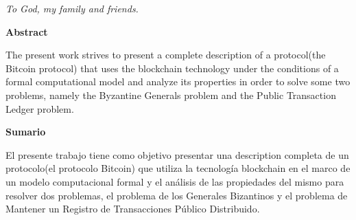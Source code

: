 \documentclass[../Main.tex]{subfiles}
\begin{document}
\begin{flushright}
	\null
	\vspace{15em}
	\emph{To God, my family and friends.}
\end{flushright}



\clearpage
\null
\vfill
\begin{center}
	\textbf{Abstract}
	\vspace{1em}

	The present work strives to present a complete description of a protocol(the Bitcoin protocol) that uses the blockchain technology under the conditions of a formal computational model and analyze its properties in order to solve some two problems, namely the Byzantine Generals problem and the Public Transaction Ledger problem.
\end{center}	
\vfill

\clearpage
\null
\vfill
\begin{center}
	\textbf{Sumario}
	\vspace{1em}

	El presente trabajo tiene como objetivo presentar una description completa de un protocolo(el protocolo Bitcoin) que utiliza la tecnología blockchain en el marco de un modelo computacional formal y el análisis de las propiedades del mismo para resolver dos problemas, el problema de los Generales Bizantinos y el problema de Mantener un Registro de Transacciones Público Distribuido.
	\end{center}	
\vfill

\setcounter{tocdepth}{1}
\tableofcontents
\listoffigures
\listoftables






\end{document}
